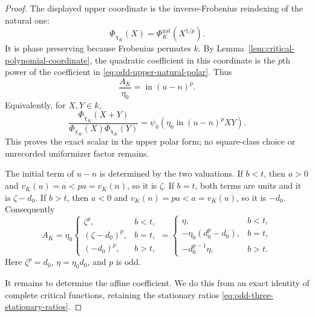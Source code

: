 \documentclass[11pt]{amsart}
\theoremstyle{definition}
\theoremstyle{remark}
\begin{document}
\begin{proof}
The displayed upper coordinate is the inverse-Frobenius reindexing of
the natural one:
\begin{equation}\label{eq:odd-upper-coordinate-reindexing}
 \Phi_{\chi_K}(X)=\Phi_K^{\mathrm{nat}}(X^{1/p}).
\end{equation}
It is phase preserving because Frobenius permutes $k$.  By
Lemma~\ref{lem:critical-polynomial-coordinate}, the quadratic
coefficient in this coordinate is the $p$th power of the coefficient
in \eqref{eq:odd-upper-natural-polar}.  Thus
\begin{equation}\label{eq:upper-A-leading}
 \frac{A_K}{\eta_0}=\operatorname{in}(u-n)^p.
\end{equation}
Equivalently, for $X,Y\in k$,
\begin{equation}\label{eq:odd-upper-displayed-polar}
 \frac{\Phi_{\chi_K}(X+Y)}
      {\Phi_{\chi_K}(X)\Phi_{\chi_K}(Y)}
 =\psi_0\!\left(
   \eta_0\operatorname{in}(u-n)^pXY\right).
\end{equation}
This proves the exact scalar in the upper polar form; no square-class
choice or unrecorded uniformizer factor remains.

The initial term of $u-n$ is determined by the two valuations.  If
$b<t$, then $a>0$ and $v_K(u)=a<pa=v_K(n)$, so it is $\zeta$.  If
$b=t$, both terms are units and it is $\zeta-d_0$.  If $b>t$, then
$a<0$ and $v_K(n)=pa<a=v_K(u)$, so it is $-d_0$.  Consequently
\[
 A_K=\eta_0
 \begin{cases}
  \zeta^p,&b<t,\\
  (\zeta-d_0)^p,&b=t,\\
  (-d_0)^p,&b>t,
 \end{cases}
 =
 \begin{cases}
  \eta,&b<t,\\
  -\eta_0(d_0^p-d_0),&b=t,\\
  -d_0^{p-1}\eta,&b>t.
 \end{cases}
\]
Here $\zeta^p=d_0$, $\eta=\eta_0d_0$, and $p$ is odd.

It remains to determine the affine coefficient.  We do this from an
exact identity of complete critical functions, retaining the
stationary ratios \eqref{eq:odd-three-stationary-ratios}.


\end{proof}
\end{document}

